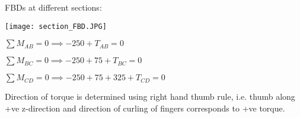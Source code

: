 \documentclass[11pt]{article}
\theoremstyle{definition}
\begin{document}
\hspace{0.5\textwidth}
\vspace{-1.5mm}

FBDs at different sections:
\vspace{2.5mm}

\texttt{[image: section\_FBD.JPG]}

$\sum M_{AB}=0\implies -250+T_{AB}=0$

$\sum M_{BC}=0\implies -250+75+T_{BC}=0$

$\sum M_{CD}=0\implies -250+75+325+T_{CD}=0$

Direction of torque is determined using right hand thumb rule, i.e. thumb along +ve z-direction and direction of curling of fingers corresponds to +ve torque.
\end{document}
